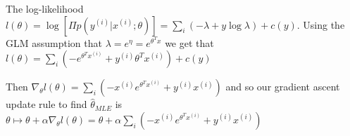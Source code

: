 %
%
\begin{answer}
The log-likelihood $l(\theta) = \log [ \Pi p(y^{(i)} | x^{(i)}; \theta)] = \sum_i (-\lambda + y \log \lambda) + c(y)$. Using the GLM assumption that $\lambda = e^\eta = e^{\theta^T x}$ we get that $l(\theta) = \sum_i \left ( -e^{\theta^T x^{(i)}} + y^{(i)} \theta^T x^{(i)} \right) + c(y)$

Then $\nabla_\theta l(\theta) = \sum_i \left( -x^{(i)} e^{\theta^T x^{(i)}} + y^{(i)} x^{(i)} \right)$ and so our gradient ascent update rule to find $\hat{\theta}_{MLE}$ is $\theta \mapsto \theta + \alpha \nabla_\theta l(\theta) = \theta + \alpha \sum_i \left( -x^{(i)} e^{\theta^T x^{(i)}} + y^{(i)} x^{(i)} \right)$
\end{answer}
%